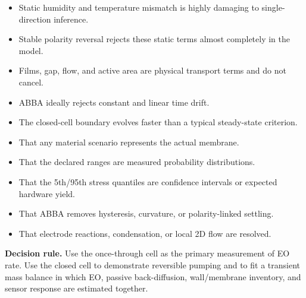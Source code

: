 \documentclass[10pt,a4paper]{article}
\begin{document}
\begin{minipage}[t]{0.485\textwidth}
\begin{tcolorbox}[colback=GreenLight,colframe=Green,colbacktitle=Green,
title={\sffamily\bfseries What the analysis shows},fonttitle=\color{white}]
\begin{itemize}
  \item Static humidity and temperature mismatch is highly damaging to single-direction inference.
  \item Stable polarity reversal rejects these static terms almost completely in the model.
  \item Films, gap, flow, and active area are physical transport terms and do not cancel.
  \item ABBA ideally rejects constant and linear time drift.
  \item The closed-cell boundary evolves faster than a typical steady-state criterion.
\end{itemize}
\end{tcolorbox}
\end{minipage}\hfill
\begin{minipage}[t]{0.485\textwidth}
\begin{stopbox}[colbacktitle=Red,title={\sffamily\bfseries What the analysis does not show},fonttitle=\color{white}]
\begin{itemize}
  \item That any material scenario represents the actual membrane.
  \item That the declared ranges are measured probability distributions.
  \item That the 5th/95th stress quantiles are confidence intervals or expected hardware yield.
  \item That ABBA removes hysteresis, curvature, or polarity-linked settling.
  \item That electrode reactions, condensation, or local 2D flow are resolved.
\end{itemize}
\end{stopbox}
\end{minipage}

\begin{warningbox}
\textbf{Decision rule.} Use the once-through cell as the primary measurement
of EO rate. Use the closed cell to demonstrate reversible pumping and to fit a
transient mass balance in which EO, passive back-diffusion, wall/membrane inventory,
and sensor response are estimated together.
\end{warningbox}
\end{document}
